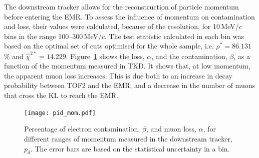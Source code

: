 The downstream tracker allows for the reconstruction of particle momentum before entering the EMR. To assess the influence of momentum on contamination and loss, their values were calculated, because of the resolution, for 10\,MeV/$c$ bins in the range 100--300\,MeV/$c$. 
The test statistic calculated in each bin was based on the optimal set of cuts optimised for the whole sample, i.e. $\rho^*=86.131$\,\% and $\hat{\chi}^{2*}=14.229$. Figure~\ref{fig:emr_pid_mom} shows the loss, $\alpha$, and the contamination, $\beta$, as a function of the momentum measured in TKD. It shows that, at low momentum, the apparent muon loss increases. This is due both to an increase in decay probability between TOF2 and the EMR, and a decrease in the number of muons that cross the KL to reach the EMR.

\begin{figure}[htb!]
	\begin{center}
		\texttt{[image: pid\_mom.pdf]}  		
		\caption{Percentage of electron contamination, $\beta$, and muon loss, $\alpha$, for different ranges of momentum measured in the downstream tracker, $p_d$. The error bars are based on the statistical uncertainty in a bin.}
		\label{fig:emr_pid_mom}
	\end{center}
\end{figure}
